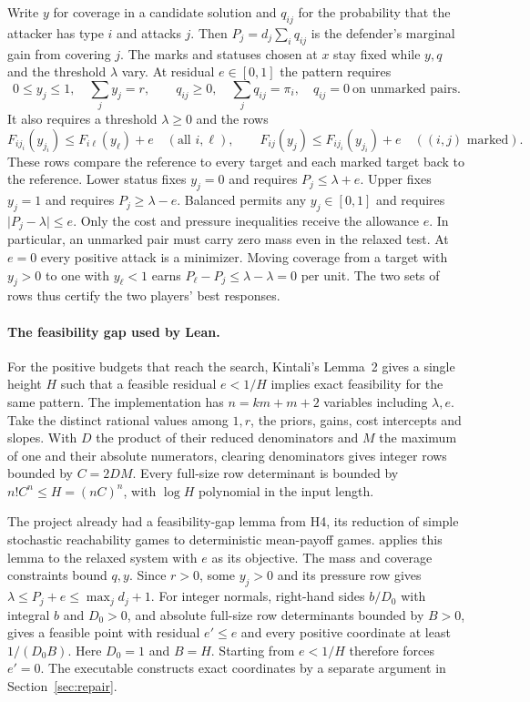 \documentclass[11pt,letterpaper]{article}
\newcommand{\code}[1]{\textnormal{\texttt{\detokenize{#1}}}}
\newcommand{\baseurl}{https://github.com/robbiemu/bayesian-simple-security-games/blob/75bc25c2ddfac1813064434a3165b3ddd1a1f63d}
\newcommand{\decl}[3]{\href{\baseurl/lean/#1.lean\#L#2}{\code{#3}}}
\newcommand{\abs}[1]{\lvert#1\rvert}
\begin{document}
Write $y$ for coverage in a candidate solution and $q_{ij}$ for the
probability that the attacker has type $i$ and attacks $j$. Then
$P_j=d_j\sum_i q_{ij}$ is the defender's marginal gain from covering $j$.
The marks and statuses chosen at $x$ stay fixed while $y,q$ and the
threshold $\lambda$ vary. At residual $e\in[0,1]$ the pattern requires
\[
  0\le y_j\le1,\quad \sum_j y_j=r,\qquad
  q_{ij}\ge0,\quad\sum_j q_{ij}=\pi_i,\quad
  q_{ij}=0\ \text{on unmarked pairs}.
\]
It also requires a threshold $\lambda\ge0$ and the rows
\[
 F_{ij_i}(y_{j_i})\le F_{i\ell}(y_\ell)+e\quad(\text{all }i,\ell),\qquad
 F_{ij}(y_j)\le F_{ij_i}(y_{j_i})+e\quad((i,j)\text{ marked}).
\]
These rows compare the reference to every target and each marked target
back to the reference. Lower status fixes $y_j=0$ and requires $P_j\le\lambda+e$.
Upper fixes $y_j=1$ and requires $P_j\ge\lambda-e$. Balanced permits
any $y_j\in[0,1]$ and requires $\abs{P_j-\lambda}\le e$.
Only the cost and pressure inequalities receive the allowance $e$. In
particular, an unmarked pair must carry zero mass even in the relaxed
test. At $e=0$ every positive attack is a minimizer. Moving coverage
from a target with $y_j>0$ to one with $y_\ell<1$ earns
$P_\ell-P_j\le\lambda-\lambda=0$ per unit. The two sets of rows thus
certify the two players' best responses.
\cite[\S1, (1)--(3)]{kintali}

\paragraph{The feasibility gap used by Lean.}
For the positive budgets that reach the search, Kintali's Lemma~2 gives
a single height $H$ such that a feasible residual $e<1/H$ implies exact
feasibility for the same pattern.
The implementation has $n=km+m+2$ variables including $\lambda,e$.
Take the distinct rational values among $1,r$, the priors, gains, cost
intercepts and slopes. With $D$ the product of their reduced denominators
and $M$ the maximum of one and their absolute numerators, clearing
denominators gives integer rows bounded by $C=2DM$. Every full-size row
determinant is bounded by $n!C^n\le H=(nC)^n$, with $\log H$ polynomial
in the input length. \cite[Lemma~2]{kintali}

The project already had a feasibility-gap lemma from H4, its reduction
of simple stochastic reachability games to deterministic mean-payoff
games. \decl{Kintali/ExactRecovery/Determinant}{86}{ExactRecovery.recover}
applies this lemma to the relaxed system with $e$ as its objective. The mass and
coverage constraints bound $q,y$. Since $r>0$, some $y_j>0$ and its
pressure row gives $\lambda\le P_j+e\le\max_j d_j+1$. For integer normals,
right-hand sides $b/D_0$ with integral $b$ and $D_0>0$, and absolute
full-size row determinants bounded by $B>0$,
\decl{StochasticGames/LinearFeasibilityGap}{42}{exists_point_with_gap_of_det_bound}
gives a feasible point with residual $e'\le e$ and every positive
coordinate at least $1/(D_0B)$. Here $D_0=1$ and $B=H$. Starting from
$e<1/H$ therefore forces $e'=0$. The executable constructs exact
coordinates by a separate argument in
Section~\ref{sec:repair}. \cite{h4}
\end{document}
